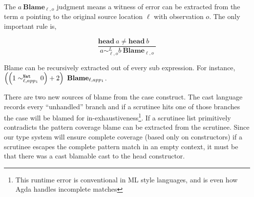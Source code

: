 The $a\ \mathbf{Blame}_{\ell,o}$ judgment means a witness of error can be extracted from the term $a$ pointing to the original source location $\ell$ with observation $o$.
The only important rule is,

\[
\frac{\mathbf{head}\ a\neq\mathbf{head}\ b\quad}{a\sim_{\ell,o}^{L}b\ \mathbf{Blame}_{\ell,o}}
\]

Blame can be recursively extracted out of every sub expression.
For instance, $\left(\left(1\sim_{\ell,app_{1}}^{\mathtt{Nat}{} }0\right)+2\right)\ \mathbf{Blame}_{\ell,app_{1}}$.

There are two new sources of blame from the case construct.
The cast language records every ``unhandled'' branch and if a scrutinee hits one of those branches the case will be blamed for in-exhaustiveness\footnote{
  This runtime error is conventional in ML style languages, and is even
how Agda handles incomplete matches }.
If a scrutinee list primitively contradicts the pattern coverage blame can be extracted from the scrutinee. 
Since our type system will ensure complete coverage (based only on constructors) if a scrutinee escapes the complete pattern match in an empty context, it must be that there was a cast blamable cast to the head constructor.







